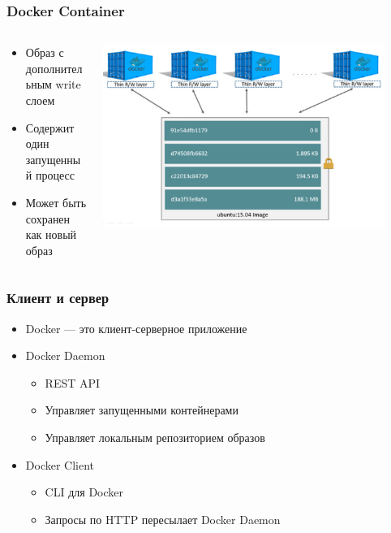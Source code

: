 \documentclass[xetex,mathserif,serif]{beamer}
\begin{document}
    \begin{frame}
        \frametitle{Docker Container}
        \begin{columns}
            \begin{column}{0.5\textwidth}
                \begin{itemize}
                    \item Образ с дополнительным write слоем
                    \item Содержит один запущенный процесс
                    \item Может быть сохранен как новый образ
                \end{itemize}
            \end{column}
            \begin{column}{0.5\textwidth}
                \includegraphics[width=0.9\textwidth]{dockerContainer.png}
            \end{column}
        \end{columns}
    \end{frame}

    \begin{frame}
        \frametitle{Клиент и сервер}
        \begin{itemize}
            \item Docker --- это клиент-серверное приложение
            \item Docker Daemon
            \begin{itemize}
                \item REST API
                \item Управляет запущенными контейнерами
                \item Управляет локальным репозиторием образов
            \end{itemize}
            \item Docker Client
            \begin{itemize}
                \item CLI для Docker
                \item Запросы по HTTP пересылает Docker Daemon
            \end{itemize}
        \end{itemize}
    \end{frame}
\end{document}
